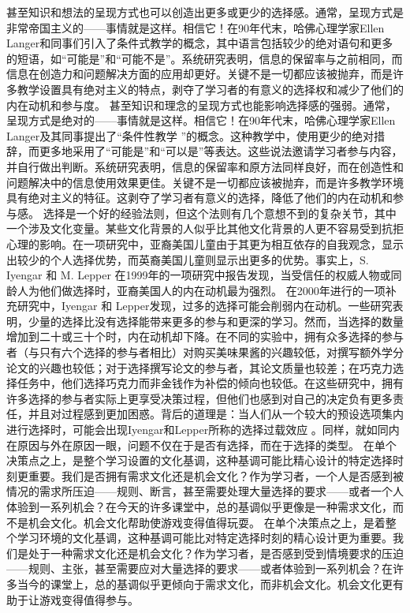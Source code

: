 甚至知识和想法的呈现方式也可以创造出更多或更少的选择感。通常，呈现方式是非常帝国主义的——事情就是这样。相信它！在90年代末，哈佛心理学家Ellen Langer和同事们引入了条件式教学的概念，其中语言包括较少的绝对语句和更多的短语，如“可能是”和“可能不是”。系统研究表明，信息的保留率与之前相同，而信息在创造力和问题解决方面的应用却更好。关键不是一切都应该被抛弃，而是许多教学设置具有绝对主义的特点，剥夺了学习者的有意义的选择权和减少了他们的内在动机和参与度。
甚至知识和理念的呈现方式也能影响选择感的强弱。通常，呈现方式是绝对的——事情就是这样。相信它！在90年代末，哈佛心理学家Ellen Langer及其同事提出了“条件性教学 ”的概念。这种教学中，使用更少的绝对措辞，而更多地采用了“可能是”和“可以是”等表达。这些说法邀请学习者参与内容，并自行做出判断。系统研究表明，信息的保留率和原方法同样良好，而在创造性和问题解决中的信息使用效果更佳。关键不是一切都应该被抛弃，而是许多教学环境具有绝对主义的特征。这剥夺了学习者有意义的选择，降低了他们的内在动机和参与感。
选择是一个好的经验法则，但这个法则有几个意想不到的复杂关节，其中一个涉及文化变量。某些文化背景的人似乎比其他文化背景的人更不容易受到抗拒心理的影响。在一项研究中，亚裔美国儿童由于其更为相互依存的自我观念，显示出较少的个人选择优势，而英裔美国儿童则显示出更多的优势。事实上，S. Iyengar 和 M. Lepper 在1999年的一项研究中报告发现，当受信任的权威人物或同龄人为他们做选择时，亚裔美国人的内在动机最为强烈。
在2000年进行的一项补充研究中，Iyengar 和 Lepper发现，过多的选择可能会削弱内在动机。一些研究表明，少量的选择比没有选择能带来更多的参与和更深的学习。然而，当选择的数量增加到二十或三十个时，内在动机却下降。在不同的实验中，拥有众多选择的参与者（与只有六个选择的参与者相比）对购买美味果酱的兴趣较低，对撰写额外学分论文的兴趣也较低；对于选择撰写论文的参与者，其论文质量也较差；在巧克力选择任务中，他们选择巧克力而非金钱作为补偿的倾向也较低。在这些研究中，拥有许多选择的参与者实际上更享受决策过程，但他们也感到对自己的决定负有更多责任，并且对过程感到更加困惑。背后的道理是：当人们从一个较大的预设选项集内进行选择时，可能会出现Iyengar和Lepper所称的选择过载效应 。同样，就如同内在原因与外在原因一眼，问题不仅在于是否有选择，而在于选择的类型。
在单个决策点之上，是整个学习设置的文化基调，这种基调可能比精心设计的特定选择时刻更重要。我们是否拥有需求文化还是机会文化？作为学习者，一个人是否感到被情况的需求所压迫——规则、断言，甚至需要处理大量选择的要求——或者一个人体验到一系列机会？在今天的许多课堂中，总的基调似乎更像是一种需求文化，而不是机会文化。机会文化帮助使游戏变得值得玩耍。
在单个决策点之上，是着整个学习环境的文化基调，这种基调可能比对特定选择时刻的精心设计更为重要。我们是处于一种需求文化还是机会文化？作为学习者，是否感到受到情境要求的压迫——规则、主张，甚至需要应对大量选择的要求——或者体验到一系列机会？在许多当今的课堂上，总的基调似乎更倾向于需求文化，而非机会文化。机会文化更有助于让游戏变得值得参与。
